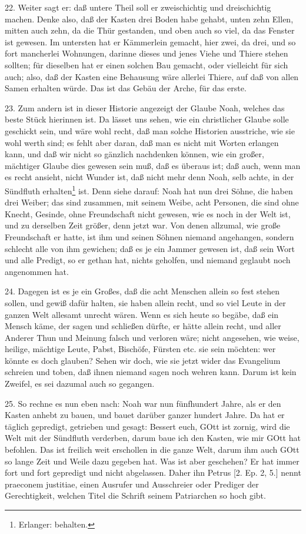 22. Weiter sagt er: daß untere Theil soll er zweischichtig und dreischichtig machen. Denke also, daß der Kasten drei Boden habe gehabt, unten zehn Ellen, mitten auch zehn, da die Thür gestanden, und oben auch so viel, da das Fenster ist gewesen. Im untersten hat er Kämmerlein gemacht, hier zwei, da drei, und so fort mancherlei Wohnungen, darinne dieses und jenes Viehe und Thiere stehen sollten; für dieselben hat er einen solchen Bau gemacht, oder vielleicht für sich auch; also, daß der Kasten eine Behausung wäre allerlei Thiere, auf daß von allen Samen erhalten würde. Das ist das Gebäu der Arche, für das erste.

23. Zum andern ist in dieser Historie angezeigt der Glaube Noah, welches das beste Stück hierinnen ist. Da lässet uns sehen, wie ein christlicher Glaube solle geschickt sein, und wäre wohl recht, daß man solche Historien ausstriche, wie sie wohl werth sind; es fehlt aber daran, daß man es nicht mit Worten erlangen kann, und daß wir nicht so gänzlich nachdenken können, wie ein großer, mächtiger Glaube dies gewesen sein muß, daß es überaus ist; daß auch, wenn man es recht ansieht, nicht Wunder ist, daß nicht mehr denn Noah, selb achte, in der Sündfluth erhalten\footnote{Erlanger: behalten.} ist. Denn siehe darauf: Noah hat nun drei Söhne, die haben drei Weiber; das sind zusammen, mit seinem Weibe, acht Personen, die sind ohne Knecht, Gesinde, ohne Freundschaft nicht gewesen, wie es noch in der Welt ist, und zu derselben Zeit größer, denn jetzt war. Von denen allzumal, wie große Freundschaft er hatte, ist ihm und seinen Söhnen niemand angehangen, sondern schlecht alle von ihm gewichen; daß es je ein Jammer gewesen ist, daß sein Wort und alle Predigt, so er gethan hat, nichts geholfen, und niemand geglaubt noch angenommen hat.

24. Dagegen ist es je ein Großes, daß die acht Menschen allein so fest stehen sollen, und gewiß dafür halten, sie haben allein recht, und so viel Leute in der ganzen Welt allesamt unrecht wären. Wenn es sich heute so begäbe, daß ein Mensch käme, der sagen und schließen dürfte, er hätte allein recht, und aller Anderer Thun und Meinung falsch und verloren wäre; nicht angesehen, wie weise, heilige, mächtige Leute, Pabst, Bischöfe, Fürsten etc. sie sein möchten: wer könnte es doch glauben? Sehen wir doch, wie sie jetzt wider das Evangelium schreien und toben, daß ihnen niemand sagen noch wehren kann. Darum ist kein Zweifel, es sei dazumal auch so gegangen.

25. So rechne es nun eben nach: Noah war nun fünfhundert Jahre, als er den Kasten anhebt zu bauen, und bauet darüber ganzer hundert Jahre. Da hat er täglich gepredigt, getrieben und gesagt: Bessert euch, GOtt ist zornig, wird die Welt mit der Sündfluth verderben, darum baue ich den Kasten, wie mir GOtt hat befohlen. Das ist freilich weit erschollen in die ganze Welt, darum ihm auch GOtt so lange Zeit und Weile dazu gegeben hat. Was ist aber geschehen? Er hat immer fort und fort gepredigt und nicht abgelassen. Daher ihn Petrus [2. Ep. 2, 5.] nennt praeconem justitiae, einen Ausrufer und Ausschreier oder Prediger der Gerechtigkeit, welchen Titel die Schrift seinem Patriarchen so hoch gibt.

